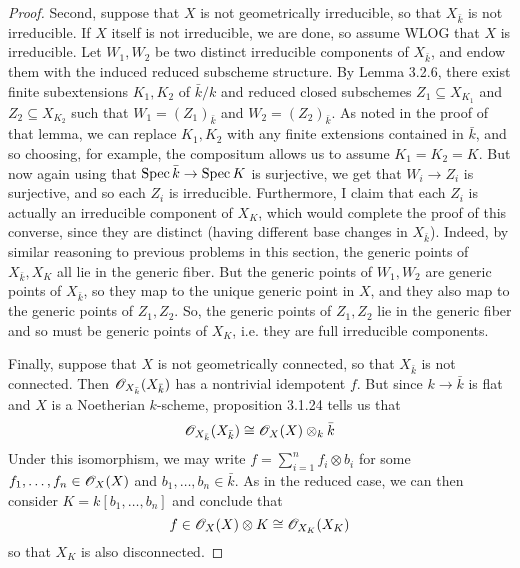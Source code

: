 \begin{proof}
	Second, suppose that $X$ is not geometrically irreducible, so that $X_{\bar{k}}$ is not irreducible. If $X$ itself is not irreducible, we are done, so assume WLOG that $X$ is irreducible. Let $W_1,W_2$ be two distinct irreducible components of $X_{\bar{k}}$, and endow them with the induced reduced subscheme structure. By Lemma 3.2.6, there exist finite subextensions $K_1,K_2$ of $\bar{k}/k$ and reduced closed subschemes $Z_1 \subseteq X_{K_1}$ and $Z_2 \subseteq X_{K_2}$ such that $W_1 = (Z_1)_{\bar{k}}$ and $W_2 = (Z_2)_{\bar{k}}$. As noted in the proof of that lemma, we can replace $K_1,K_2$ with any finite extensions contained in $\bar{k}$, and so choosing, for example, the compositum allows us to assume $K_1 = K_2 = K$. But now again using that $\operatorname{Spec}\bar{k} \to \operatorname{Spec} K$ is surjective, we get that $W_i \to Z_i$ is surjective, and so each $Z_i$ is irreducible. Furthermore, I claim that each $Z_i$ is actually an irreducible component of $X_K$, which would complete the proof of this converse, since they are distinct (having different base changes in $X_{\bar{k}}$). Indeed, by similar reasoning to previous problems in this section, the generic points of $X_{\bar{k}},X_K$ all lie in the generic fiber. But the generic points of $W_1,W_2$ are generic points of $X_{\bar{k}}$, so they map to the unique generic point in $X$, and they also map to the generic points of $Z_1,Z_2$. So, the generic points of $Z_1,Z_2$ lie in the generic fiber and so must be generic points of $X_K$, i.e. they are full irreducible components.
	
	Finally, suppose that $X$ is not geometrically connected, so that $X_{\bar{k}}$ is not connected. Then $\mathscr{O}_{X_{\bar{k}}}(X_{\bar{k}})$ has a nontrivial idempotent $f$. But since $k \to \bar{k}$ is flat and $X$ is a Noetherian $k$-scheme, proposition 3.1.24 tells us that
	\[ \mathscr{O}_{X_{\bar{k}}}(X_{\bar{k}}) \cong \mathscr{O}_X(X) \otimes_k \bar{k} \]
	Under this isomorphism, we may write $f = \sum_{i=1}^n f_i \otimes b_i$ for some $f_1,\ldots,f_n \in \mathscr{O}_X(X)$ and $b_1,\ldots,b_n \in \bar{k}$. As in the reduced case, we can then consider $K = k[b_1,\ldots,b_n]$ and conclude that
	\[ f \in \mathscr{O}_X(X) \otimes K \cong \mathscr{O}_{X_K}(X_K) \]
	so that $X_K$ is also disconnected.
\end{proof}
